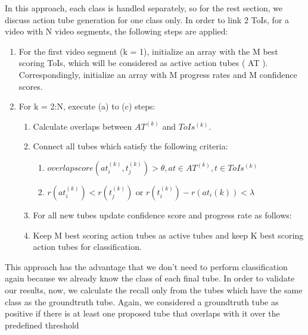 In this approach, each class is handled separately, so for the rest section, we discuss action tube generation for one class only. In order to link 2 ToIs, for
a video with N video segments, the following steps are applied:
\begin{enumerate}
\item For the first video segment (k = 1), initialize an array with the M best scoring ToIs, which will be considered as active action tubes ( AT ).
  Correspondingly, initialize an array with M progress rates  and M confidence scores.
\item For k = 2:N, execute (a) to (c) steps:
  \begin{enumerate}
  \item Calculate overlaps between $ AT^{(k)} $ and $ ToIs^{(k)}. $
  \item Connect all tubes which satisfy the following criteria:
    \begin{enumerate}
    \item $ overlap score(at_i^{(k)},t_j^{(k)})   > \theta, 
      at  \in AT^{(k)}, t \in ToIs^{(k)}  $
    \item $r(at_i^{(k)}) < r(t_j^{(k)}) $ or 
      $r(t_i^{(k)}) - r(at_i{(k)}) < \lambda $
    \end{enumerate}
    
  \item For all new tubes update confidence score and progress rate as follows:
  \item Keep M best scoring action tubes as active tubes and keep K best scoring action tubes for classification.
  \end{enumerate}
  
\end{enumerate}

This approach has the advantage that we don't need to perform classification again because we already know the class of
each final tube. In order to validate our results, now, we calculate the recall only from the tubes which have the same
class as the groundtruth tube. Again, we considered a groundtruth  tube as positive if there is at least one proposed  tube
that overlaps with it over the predefined threshold

